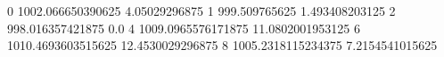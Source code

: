 0 1002.066650390625 4.05029296875
1 999.509765625 1.493408203125
2 998.016357421875 0.0
4 1009.0965576171875 11.0802001953125
6 1010.4693603515625 12.4530029296875
8 1005.2318115234375 7.2154541015625
